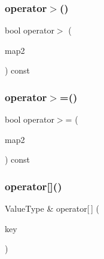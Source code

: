 \mbox{\label{classMap_a991d18b9e2b2e21bd63f6fae462f56f6}} 
\subsubsection{\texorpdfstring{operator$>$()}{operator>()}}
{\footnotesize\ttfamily bool operator$>$ (\begin{DoxyParamCaption}\item[{const \mbox{\hyperlink{classMap}{Map}}$<$ Key\+Type, Value\+Type $>$ \&}]{map2 }\end{DoxyParamCaption}) const}

\mbox{\label{classMap_a1e36cb0cc936dcb2be3362158099bc8e}} 
\subsubsection{\texorpdfstring{operator$>$=()}{operator>=()}}
{\footnotesize\ttfamily bool operator$>$= (\begin{DoxyParamCaption}\item[{const \mbox{\hyperlink{classMap}{Map}}$<$ Key\+Type, Value\+Type $>$ \&}]{map2 }\end{DoxyParamCaption}) const}

\mbox{\label{classMap_a5bd092d78b82b4818d17917816a59730}} 
\subsubsection{\texorpdfstring{operator[]()}{operator[]()}\hspace{0.1cm}{\footnotesize\ttfamily [1/2]}}
{\footnotesize\ttfamily Value\+Type \& operator\mbox{[}$\,$\mbox{]} (\begin{DoxyParamCaption}\item[{const Key\+Type \&}]{key }\end{DoxyParamCaption})}

\mbox{\label{classMap_a9f52896b148cfbbc16e12ad1008971b1}} 
